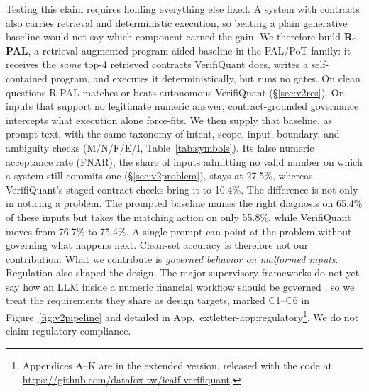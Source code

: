 \documentclass[sigconf]{acmart}
\newcommand{\govVQfnar}{10.4\%}           %
\newcommand{\govPromptFnar}{27.5\%}       %
\newcommand{\govVQdiag}{76.7\%}
\newcommand{\govVQaction}{75.4\%}
\newcommand{\govPromptDiag}{65.4\%}
\newcommand{\govPromptAction}{55.8\%}
\newif\ifarxiv
\newcommand{\extref}[1]{App.~\ifarxiv\ref{#1}\else\csname extletter-#1\endcsname\fi}
\begin{document}
Testing this claim requires holding everything else fixed. A system with contracts also carries retrieval and deterministic execution, so beating a plain generative baseline would not say which component earned the gain. We therefore build \textbf{R-PAL}, a retrieval-augmented program-aided baseline in the PAL/PoT family: it receives the \emph{same} top-4 retrieved contracts VerifiQuant does, writes a self-contained program, and executes it deterministically, but runs no gates.
On clean questions R-PAL matches or beats autonomous VerifiQuant (\S\ref{sec:v2res}). On inputs that support no legitimate numeric answer, contract-grounded governance intercepts what execution alone force-fits. We then supply that baseline, as prompt text, with the same taxonomy of intent, scope, input, boundary, and ambiguity checks (M/N/F/E/I, Table~\ref{tab:symbols}).
Its false numeric acceptance rate (FNAR), the share of inputs admitting no valid number on which a system still commits one (\S\ref{sec:v2problem}), stays at \govPromptFnar{}, whereas VerifiQuant's staged contract checks bring it to \govVQfnar{}.
The difference is not only in noticing a problem. The prompted baseline names the right diagnosis on \govPromptDiag{} of these inputs but takes the matching action on only \govPromptAction{}, while VerifiQuant moves from \govVQdiag{} to \govVQaction{}. A single prompt can point at the problem without governing what happens next.
Clean-set accuracy is therefore not our contribution. What we contribute is \emph{governed behavior on malformed inputs}.
Regulation also shaped the design. The major supervisory frameworks do not yet say how an LLM inside a numeric financial workflow should be governed \cite{fed2026sr262,pra2023ss123,euaiact2024}, so we treat the requirements they share as design targets, marked C1--C6 in Figure~\ref{fig:v2pipeline} and detailed in \extref{app:regulatory}\footnote{Appendices A--K are in the extended version, released with the code at \url{https://github.com/datafox-tw/icaif-verifiquant}.}. We do not claim regulatory compliance.
\end{document}
